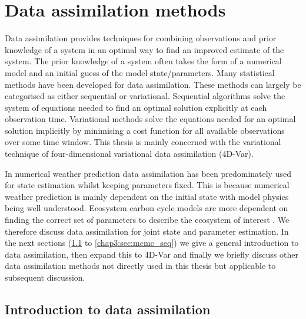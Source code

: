 

\section{Data assimilation methods}

Data assimilation provides techniques for combining observations and prior knowledge of a system in an optimal way to find an improved estimate of the system. The prior knowledge of a system often takes the form of a numerical model and an initial guess of the model state/parameters. Many statistical methods have been developed for data assimilation. These methods can largely be categorised as either sequential or variational. Sequential algorithms solve the system of equations needed to find an optimal solution explicitly at each observation time. Variational methods solve the equations needed for an optimal solution implicitly by minimising a cost function for all available observations over some time window. This thesis is mainly concerned with the variational technique of four-dimensional variational data assimilation (4D-Var). 

In numerical weather prediction data assimilation has been predominately used for state estimation whilst keeping parameters fixed. This is because numerical weather prediction is mainly dependent on the initial state with model physics being well understood. Ecosystem carbon cycle models are more dependent on finding the correct set of parameters to describe the ecosystem of interest \citep{luo2015predictability}. We therefore discuss data assimilation for joint state and parameter estimation. In the next sections (\ref{chap3:sec:intro_da} to \ref{chap3:sec:mcmc_seq}) we give a general introduction to data assimilation, then expand this to 4D-Var and finally we briefly discuss other data assimilation methods not directly used in this thesis but applicable to subsequent discussion. 

\subsection{Introduction to data assimilation} \label{chap3:sec:intro_da}

